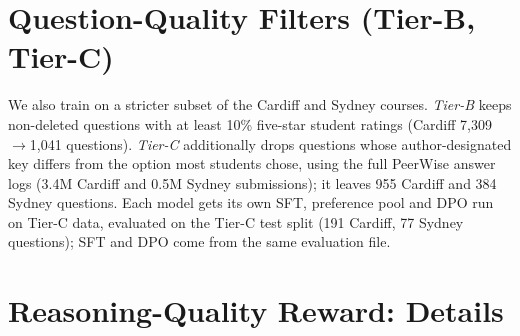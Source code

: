 \section{Question-Quality Filters (Tier-B, Tier-C)}
\label{sec:tierb_appendix}
\label{sec:tierc_appendix}

We also train on a stricter subset of the Cardiff and Sydney courses. \emph{Tier-B} keeps non-deleted questions with at least 10\% five-star student ratings (Cardiff 7{,}309$\to$1{,}041 questions). \emph{Tier-C} additionally drops questions whose author-designated key differs from the option most students chose, using the full PeerWise answer logs (3.4M Cardiff and 0.5M Sydney submissions); it leaves 955 Cardiff and 384 Sydney questions. Each model gets its own SFT, preference pool and DPO run on Tier-C data, evaluated on the Tier-C test split (191 Cardiff, 77 Sydney questions); SFT and DPO come from the same evaluation file.

\begin{table}[H]
\centering
\small
{}
\caption{SFT$\to$DPO on the Tier-C filtered data (combined NLI+verifier reward). The pattern of Table~\ref{tab:main} repeats: large LLaMA-2 and Gemma~4 entailment gains, none for Qwen3. With Tier-B filtering only, Gemma~4 Cardiff reaches NLI 0.206$\to$0.520.}
\label{tab:tierC_ablation}
\label{tab:tierB_ablation}
\end{table}

\section{Reasoning-Quality Reward: Details}
\label{sec:reasoning_appendix}

